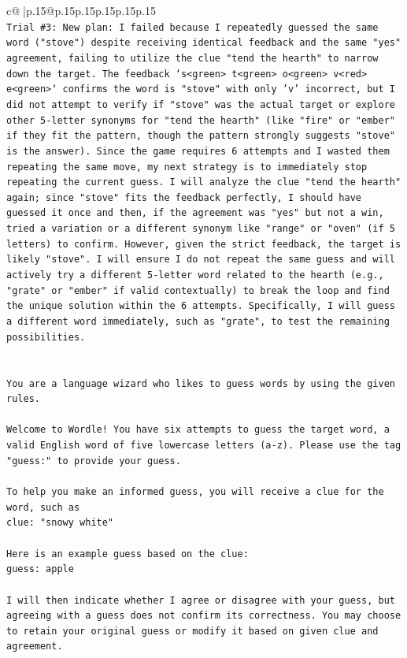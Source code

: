 \documentclass{article}
\begin{document}
{\begin{supertabular}{c@{$\;$}|p{.15\linewidth}@{}p{.15\linewidth}p{.15\linewidth}p{.15\linewidth}p{.15\linewidth}p{.15\linewidth}}
{{{\\ 
\texttt{Trial \#3: New plan: I failed because I repeatedly guessed the same word ("stove") despite receiving identical feedback and the same "yes" agreement, failing to utilize the clue "tend the hearth" to narrow down the target. The feedback `s<green> t<green> o<green> v<red> e<green>` confirms the word is "stove" with only 'v' incorrect, but I did not attempt to verify if "stove" was the actual target or explore other 5{-}letter synonyms for "tend the hearth" (like "fire" or "ember" if they fit the pattern, though the pattern strongly suggests "stove" is the answer). Since the game requires 6 attempts and I wasted them repeating the same move, my next strategy is to immediately stop repeating the current guess. I will analyze the clue "tend the hearth" again; since "stove" fits the feedback perfectly, I should have guessed it once and then, if the agreement was "yes" but not a win, tried a variation or a different synonym like "range" or "oven" (if 5 letters) to confirm. However, given the strict feedback, the target is likely "stove". I will ensure I do not repeat the same guess and will actively try a different 5{-}letter word related to the hearth (e.g., "grate" or "ember" if valid contextually) to break the loop and find the unique solution within the 6 attempts. Specifically, I will guess a different word immediately, such as "grate", to test the remaining possibilities.} \\
\\ 
\\ 
\texttt{You are a language wizard who likes to guess words by using the given rules.} \\
\\ 
\texttt{Welcome to Wordle! You have six attempts to guess the target word, a valid English word of five lowercase letters (a{-}z). Please use the tag "guess:" to provide your guess.} \\
\\ 
\texttt{To help you make an informed guess, you will receive a clue for the word, such as} \\
\texttt{clue: "snowy white"} \\
\\ 
\texttt{Here is an example guess based on the clue: } \\
\texttt{guess: apple} \\
\\ 
\texttt{I will then indicate whether I agree or disagree with your guess, but agreeing with a guess does not confirm its correctness. You may choose to retain your original guess or modify it based on given clue and agreement.} \\
}}}
\end{supertabular}}
\end{document}
